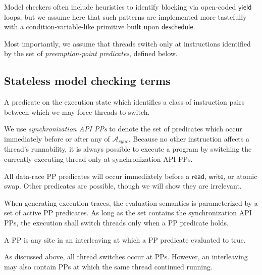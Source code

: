 Model checkers often include heuristics to identify blocking via open-coded $\mathsf{yield}$ loops,
but we assume here that such patterns are implemented more tastefully with a condition-variable-like primitive built upon $\mathsf{deschedule}$.

Most importantly, we assume that threads switch only at instructions identified by the set of {\em preemption-point predicates}, defined below.

\subsection{Stateless model checking terms}

\begin{definition}
	A predicate on the execution state which identifies a class of instruction pairs between which we may force threads to switch.
\end{definition}

We use {\em synchronization API PPs} to denote the set of predicates
which occur immediately before or after any of $\mathcal{A}_{sync}$.
Because no other instruction affects a thread's runnability, it is always possible to execute a program by switching the currently-executing thread only at synchronization API PPs.

All data-race PP predicates will occur immediately before a $\mathsf{read}$, $\mathsf{write}$, or atomic swap.
Other predicates are possible, though we will show they are irrelevant.

When generating execution traces, the evaluation semantics is parameterized by a set of active PP predicates.
As long as the set contains the synchronization API PPs,
the execution shall switch threads only when a PP predicate holds.

\begin{definition}
	A PP is any site in an interleaving at which a PP predicate evaluated to true.
\end{definition}

As discussed above, all thread switches occur at PPs.
However, an interleaving may also contain PPs at which the same thread continued running.

